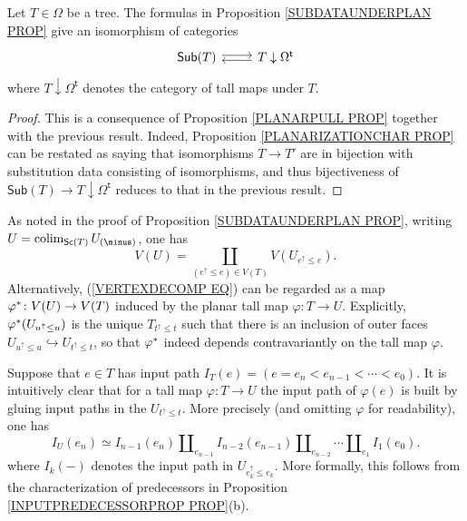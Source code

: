 \documentclass[a4paper,10pt]{article}%
\begin{document}
\begin{corollary}\label{SUBDATAUNDERPLAN COR}
Let $T \in \Omega$ be a tree. The formulas in
Proposition \ref{SUBDATAUNDERPLAN PROP}
give an isomorphism of categories
\[
\begin{tikzcd}[row sep =0pt]
	\mathsf{Sub}(T) \ar[r,shift left=2pt] &
	T \downarrow \Omega^{\mathsf{t}} \ar[l,shift left=2pt]
\end{tikzcd}
\]
where $T \downarrow \Omega^{\mathsf{t}}$ denotes
the category of tall maps under $T$.
\end{corollary}


\begin{proof}
	This is a consequence of Proposition \ref{PLANARPULL PROP} together with the previous result.
	Indeed, Proposition \ref{PLANARIZATIONCHAR PROP} can be restated as saying that isomorphisms $T \to T'$ are in bijection with substitution data consisting of isomorphisms, and thus  bijectiveness of $\mathsf{Sub}(T) \to T \downarrow \Omega^{\mathsf{t}}$ reduces to that in the previous result.
\end{proof}

\begin{remark}\label{VERTEXDECOMP REM}
As noted in the proof of Proposition \ref{SUBDATAUNDERPLAN PROP}, writing $U = \colim_{\mathsf{Sc}(T)}U_{(\minus)}$,
	one has 
\begin{equation}\label{VERTEXDECOMP EQ}
	V(U) = \coprod_{(e^{\uparrow} \leq e) \in V(T)}
	V(U_{e^{\uparrow} \leq e}).
  \end{equation}
    Alternatively, (\ref{VERTEXDECOMP EQ}) can be regarded as a map 
    $\varphi^{\**} \colon V(U) \to V(T)$ induced by the planar tall map 
    $\varphi \colon T \to U$.
    Explicitly, $\varphi^{\**}(U_{u^{\uparrow} \leq u})$ 
    is the unique $T_{t^{\uparrow}\leq t}$ such that
    there is an inclusion of outer faces $U_{u^{\uparrow} \leq u} \hookrightarrow U_{t^{\uparrow} \leq t}$,
    so that $\varphi^{\**}$ indeed depends contravariantly on the tall map $\varphi$.
\end{remark}

\begin{remark}\label{INPPATH REM}
Suppose that $e \in T$ has input path
$I_T(e) = (e=e_n < e_{n-1} < \cdots < e_0)$.
It is intuitively clear that for a tall map 
$\varphi \colon T \to U$ the input path of $\varphi(e)$ is built by gluing input paths in the $U_{t^{\uparrow} \leq t}$. More precisely (and omitting $\varphi$ for readability), one has
\[
	I_U\left(e_n \right) \simeq 
	I_{n-1}(e_n) \amalg_{e_{n-1}} I_{n-2}(e_{n-1})
	\amalg_{e_{n-2}} \cdots
	\amalg_{e_1} I_1(e_0).
\]
where $I_k(\minus)$ denotes the input path in $U_{e_k^{\uparrow} \leq e_k}$.
More formally, this follows from the characterization of 
predecessors in Proposition \ref{INPUTPREDECESSORPROP PROP}(b).
\end{remark}
\end{document}

